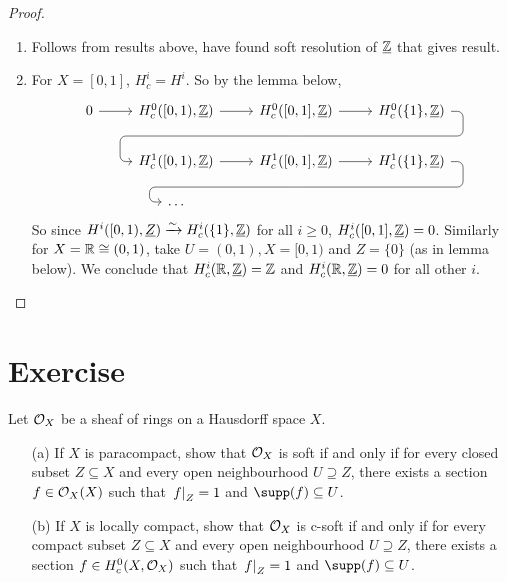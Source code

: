 \documentclass[../main.tex]{subfiles}
\begin{document}
\begin{proof}
    \leavevmode
    \begin{enumerate}
        \item Follows from results above, have found soft resolution of $\underline{\mathbb{Z}}$ that gives result.
        \item  For $X = [0,1]$, $H^i_c = H^i$. So by the lemma below,
        \[\begin{tikzcd}
            0 \ar[r] & H^0_c([0,1), \underline{\bb Z}) \ar[r] & H^0_c([0,1], \underline{\bb Z}) \ar[r] \ar[draw=none]{d}[name=X, anchor=center]{} & H^0_c(\{1\}, \underline{\bb Z})
            \ar[rounded corners,
            to path={ -- ([xshift=2ex]\tikztostart.east)
                      |- (X.center) \tikztonodes
                      -| ([xshift=-2ex]\tikztotarget.west)
                      -- (\tikztotarget)}]{dll}[at end]{} \\
            & H^1_c([0,1), \underline{\bb Z}) \ar[r] & H^1_c([0,1], \underline{\bb Z}) \ar[r] \ar[draw=none]{d}[name=Y, anchor=center]{} & H^1_c(\{1\}, \underline{\bb Z})
            \ar[rounded corners,
            to path={ -- ([xshift=2ex]\tikztostart.east)
                      |- (Y.center) \tikztonodes
                      -| ([xshift=-2ex]\tikztotarget.west)
                      -- (\tikztotarget)}]{dll}[at end]{} \\
            & \dots & {} & {}
        \end{tikzcd}\]
        So since $H^i([0,1), \underline{Z}) \xrightarrow{\sim} H^i_c(\{1\}, \underline{\mathbb{Z}})$ for all $i\geq 0$, $H^i_c([0,1], \underline{\mathbb{Z}}) = 0$. Similarly for $X = \mathbb{R} \cong (0,1)$, take $U = (0,1), X = [0,1)$ and $Z = \{0\}$ (as in lemma below). We conclude that $H^i_c(\mathbb{R}, \underline{\mathbb{Z}}) = \mathbb{Z}$ and $H^i_c(\mathbb{R}, \underline{\mathbb{Z}}) = 0$ for all other $i$. 
        \qedhere
    \end{enumerate}
\end{proof}

\section*{Exercise}

\begin{exe} Let $\mathcal{O}_X$ be a sheaf of rings on a Hausdorff space $X$.
\begin{enumerate}
    \item[(a)] If $X$ is paracompact, show that $\mathcal{O}_X$ is soft if and only if for every closed subset $Z\subseteq X$ and every open neighbourhood $U\supseteq Z$, there exists a section $f\in \mathcal{O}_X(X)$ such that $\left.f\right|_{Z} = 1$ and $\supp(f)\subseteq U$. 
    \item[(b)] If $X$ is locally compact, show that $\mathcal{O}_X$ is c-soft if and only if for every compact subset $Z\subseteq X$ and every open neighbourhood $U\supseteq Z$, there exists a section $f\in H^0_c(X, \mathcal{O}_X)$ such that $\left.f\right|_{Z} = 1$ and $\supp(f) \subseteq U$. 
\end{enumerate}

\end{exe}
\end{document}
